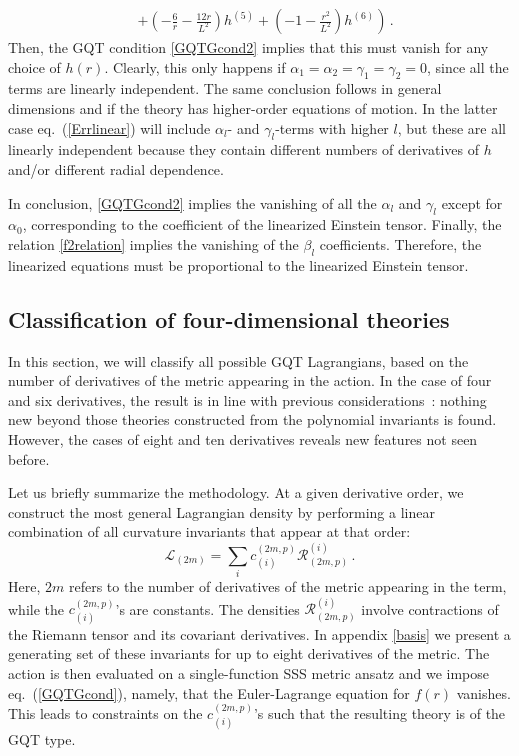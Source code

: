 \documentclass[11pt]{article}
\newcommand{\req}[1]{(\ref{#1})} %
\newcommand{\be}{\begin{equation}}
\newcommand{\ee}{\end{equation} }
\renewcommand{\req}[1]{eq.~(\ref{#1})}
\begin{document}
{\begin{equation}
\begin{aligned}
&\left.+\left(-\frac{6}{r}-\frac{12
   r}{L^2}\right) h^{(5)}+\left(-1-\frac{r^2}{L^2}\right) h^{(6)}\right)\, .
   \end{aligned}
\end{equation}
Then, the GQT condition \eqref{GQTGcond2} implies that this must vanish for any choice of $h(r)$. Clearly, this only happens if $\alpha_1=\alpha_2=\gamma_1=\gamma_2=0$, since all the terms are linearly independent. The same conclusion follows in general dimensions and if the theory has higher-order equations of motion. In the latter case \req{Errlinear} will include $\alpha_l$- and $\gamma_l$-terms with higher $l$, but these are all linearly independent because they contain different numbers of derivatives of $h$ and/or different radial dependence. 

In conclusion, \eqref{GQTGcond2} implies the vanishing of all the $\alpha_{l}$ and $\gamma_{l}$ except for $\alpha_0$, corresponding to the coefficient of the linearized Einstein tensor. Finally, the relation \eqref{f2relation} implies the vanishing of the $\beta_{l}$ coefficients. Therefore, the linearized equations must be proportional to the linearized Einstein tensor. 



\subsection{Classification of four-dimensional theories}
\label{sec:4dTheories}

In this section, we will classify all possible GQT Lagrangians, based on the number of derivatives of the metric appearing in the action. In the case of four and six derivatives, the result is in line with previous considerations~\cite{Quasi2, Quasi, Hennigar:2017ego, PabloPablo3}: nothing new beyond those theories constructed from the polynomial invariants is found. However, the cases of eight and ten derivatives reveals new features not seen before. 

Let us briefly summarize the methodology. At a given derivative order, we construct the most general Lagrangian density by performing a linear combination of all curvature invariants that appear at that order:
\be 
\mathcal{L}_{(2m)} = \sum_{i} c_{(i)}^{(2m,p)} \mathcal{R}^{(i)}_{(2m,p)} \, .
\ee
Here, $2m$ refers to the number of derivatives of the metric appearing in the term, while the $c_{(i)}^{(2m,p)}$'s are constants. The densities $ \mathcal{R}^{(i)}_{(2m,p)} $ involve contractions of the Riemann tensor and its covariant derivatives. In appendix \ref{basis} we present a generating set of these invariants for up to eight derivatives of the metric. The action is then evaluated on a single-function SSS metric ansatz and we impose \req{GQTGcond}, namely, that the Euler-Lagrange equation for $f(r)$ vanishes. This leads to constraints on the $c_{(i)}^{(2m,p)}$'s such that the resulting theory is of the GQT  type. 

}
\end{document}
